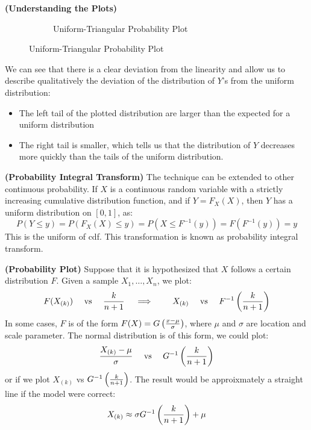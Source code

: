 \begin{remark}{\textbf{(Understanding the Plots)}}
\begin{figure}[H]
\begin{subfigure}{.5\textwidth}
        \caption{Uniform-Triangular Probability Plot}
        \label{fig:1-sub2}
    \end{subfigure}
    \end{figure}
    We can see that there is a clear deviation from the linearity and allow us to describe qualitatively the deviation of the distribution of $Y$'s from the uniform distribution:
    \begin{itemize}
        \item The left tail of the plotted distribution are larger than the expected for a uniform distribution
        \item The right tail is smaller, which tells us that the distribution of $Y$ decreases more quickly than the tails of the uniform distribution. 
    \end{itemize}
\end{remark}

\begin{definition}{\textbf{(Probability Integral Transform)}}
    The technique can be extended to other continuous probability.
    If $X$ is a continuous random variable with a strictly increasing cumulative distribution function, and if $Y = F_X(X)$, then $Y$ has a uniform distribution on $[0, 1]$, as:
    \begin{equation*}
        P(Y \le y) = P(F_X(X) \le y) = P(X \le F^{-1}(y)) = F(F^{-1}(y)) = y
    \end{equation*} 
    This is the uniform of cdf. This transformation is known as probability integral transform.
\end{definition}

\begin{remark}{\textbf{(Probability Plot)}}
    Suppose that it is hypothesized that $X$ follows a certain distribution $F$. Given a sample $X_1,\dots,X_n$, we plot:
    \begin{equation*}
    \begin{aligned}
        F(X_{(k)}) \quad \text{ vs } \quad \frac{k}{n+1} \quad \implies \qquad X_{(k)} \quad\text{ vs }\quad F^{-1}\left( \frac{k}{n+1} \right)
    \end{aligned}
    \end{equation*}
    In some cases, $F$ is of the form $F(X) = G\left( \frac{x-\mu}{\sigma} \right)$, where $\mu$ and $\sigma$ are location and scale parameter. The normal distribution is of this form, we could plot:
    \begin{equation*}
        \frac{X_{(k)} - \mu}{\sigma} \quad \text{ vs }  \quad G^{-1}\left( \frac{k}{n+1} \right)
    \end{equation*}
    or if we plot $X_{(k)}$ vs $G^{-1}\left( \frac{k}{n+1} \right)$. The result would be approixmately a straight line if the model were correct:
    \begin{equation*}
        X_{(k)} \approx \sigma G^{-1}\left( \frac{k}{n+1} \right) + \mu
    \end{equation*}
\end{remark}

